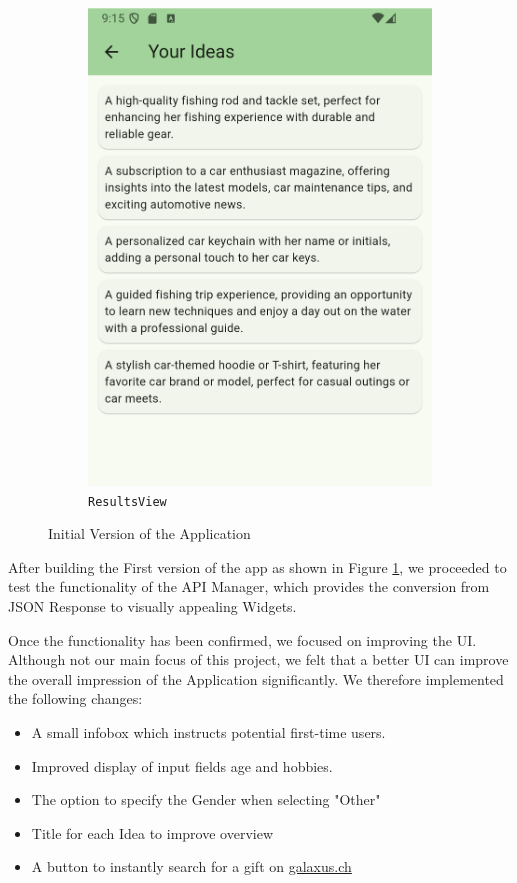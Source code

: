 \begin{figure}
\begin{subfigure}{0.5\textwidth}
		\includegraphics[width=0.9\linewidth]{figures/screenshots/old_results_view_cropped.png}
		\caption{\texttt{ResultsView}}
	\end{subfigure}
	\caption{Initial Version of the Application}
	\label{fig:initialVersion}
\end{figure}

After building the First version of the app as shown in Figure \ref{fig:initialVersion}, we proceeded to test the functionality of the API Manager, which provides the conversion from JSON Response to visually appealing Widgets.

Once the functionality has been confirmed, we focused on improving the UI. Although not our main focus of this project, we felt that a better UI can improve the overall impression of the Application significantly. We therefore implemented the following changes:

\begin{itemize}
	\item A small infobox which instructs potential first-time users.

	\item Improved display of input fields age and hobbies.

	\item The option to specify the Gender when selecting "Other"

	\item Title for each Idea to improve overview

	\item A button to instantly search for a gift on \url{galaxus.ch}
\end{itemize}

